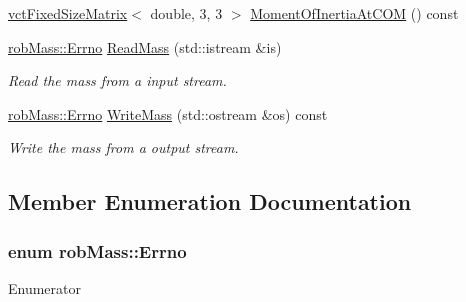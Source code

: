 \begin{DoxyCompactItemize}
\hyperlink{classvct_fixed_size_matrix}{vct\+Fixed\+Size\+Matrix}$<$ double, 3, 3 $>$ \hyperlink{classrob_mass_aae2190ef44e17e969f3265129b0ca093}{Moment\+Of\+Inertia\+At\+C\+O\+M} () const 
\item 
\hyperlink{classrob_mass_a85e715c568a7c8b1fff957b046164649}{rob\+Mass\+::\+Errno} \hyperlink{classrob_mass_a148ed4305b5291bc764cb9be17584d33}{Read\+Mass} (std\+::istream \&is)
\begin{DoxyCompactList}\small\item\em Read the mass from a input stream. \end{DoxyCompactList}\item 
\hyperlink{classrob_mass_a85e715c568a7c8b1fff957b046164649}{rob\+Mass\+::\+Errno} \hyperlink{classrob_mass_a6b11b3b2725686b58a91a441b809cec4}{Write\+Mass} (std\+::ostream \&os) const 
\begin{DoxyCompactList}\small\item\em Write the mass from a output stream. \end{DoxyCompactList}\end{DoxyCompactItemize}


\subsection{Member Enumeration Documentation}
\hypertarget{classrob_mass_a85e715c568a7c8b1fff957b046164649}{}
\subsubsection[{Errno}]{\setlength{\rightskip}{0pt plus 5cm}enum {\bf rob\+Mass\+::\+Errno}}\label{classrob_mass_a85e715c568a7c8b1fff957b046164649}
\begin{Desc}
\item[Enumerator]\par
\begin{description}
\item[{\em 
\hypertarget{classrob_mass_a85e715c568a7c8b1fff957b046164649add68e16ef430713d59f0adb01b14b94e}{}E\+S\+U\+C\+C\+E\+S\+S\label{classrob_mass_a85e715c568a7c8b1fff957b046164649add68e16ef430713d59f0adb01b14b94e}
}]\item[{\em 
\hypertarget{classrob_mass_a85e715c568a7c8b1fff957b046164649a73f4b04ad9d26f8bd81f6bdc9cee9a66}{}E\+F\+A\+I\+L\+U\+R\+E\label{classrob_mass_a85e715c568a7c8b1fff957b046164649a73f4b04ad9d26f8bd81f6bdc9cee9a66}
}]\end{description}
\end{Desc}


